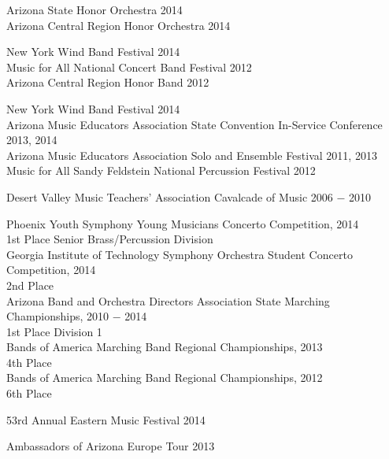 
{
	Arizona State Honor Orchestra \hfill 2014\\
	Arizona Central Region Honor Orchestra \hfill 2014
	
	
}

{
	New York Wind Band Festival \hfill 2014\\
	Music for All National Concert Band Festival \hfill 2012\\
	Arizona Central Region Honor Band \hfill 2012
	
	
}

{
	New York Wind Band Festival \hfill 2014\\
	Arizona Music Educators Association State Convention In-Service Conference \hfill 2013, 2014\\
	Arizona Music Educators Association Solo and Ensemble Festival \hfill 2011, 2013\\
	Music for All Sandy Feldstein National Percussion Festival \hfill 2012
	
	
}

{
	Desert Valley Music Teachers' Association Cavalcade of Music \hfill 2006 $-$ 2010
	
	
}

{
	Phoenix Youth Symphony Young Musicians Concerto Competition, \hfill 2014\\
	\hspace*{16pt}
	1st Place Senior Brass/Percussion Division\\
	Georgia Institute of Technology Symphony Orchestra Student Concerto Competition,  \hfill 2014\\
	\hspace*{16pt}
	2nd Place\\
	Arizona Band and Orchestra Directors Association State Marching Championships, \hfill 2010 $-$ 2014\\
	\hspace*{16pt}
	1st Place Division 1\\
	Bands of America Marching Band Regional Championships, \hfill 2013\\
	\hspace*{16pt}
	4th Place\\
	Bands of America Marching Band Regional Championships, \hfill 2012\\
	\hspace*{16pt}
	6th Place
	
	
}

{
	53rd Annual Eastern Music Festival \hfill 2014
	
	
}

{
	Ambassadors of Arizona Europe Tour \hfill 2013
	
	
}